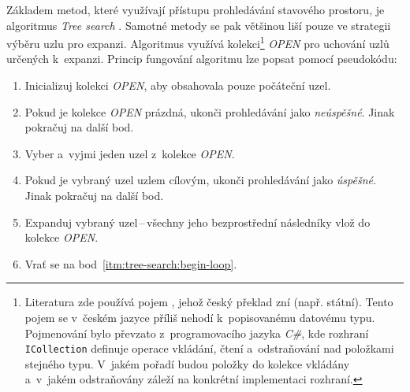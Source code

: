 Základem metod, které využívají přístupu prohledávání stavového prostoru, je algoritmus \emph{Tree search} \cite{AI_Russel_Norvig}. Samotné metody se pak většinou liší pouze ve strategii výběru uzlu pro expanzi. Algoritmus využívá kolekci\footnote{Literatura \cite{AI_Russel_Norvig} zde používá pojem , jehož český překlad zní  (např. státní). Tento pojem se v~českém jazyce příliš nehodí k~popisovanému datovému typu. Pojmenování  bylo převzato z~programovacího jazyka \emph{C\#}, kde rozhraní \texttt{ICollection} definuje operace vkládání, čtení a~odstraňování nad položkami stejného typu. V~jakém pořadí budou položky do kolekce vkládány a~v~jakém odstraňovány záleží na konkrétní implementaci rozhraní.} \emph{OPEN} pro uchování uzlů určených k~expanzi. Princip fungování algoritmu lze popsat pomocí pseudokódu:
\begin{enumerate}
    \item Inicializuj kolekci \emph{OPEN}, aby obsahovala pouze počáteční uzel.
    \item \label{itm:tree-search:begin-loop} Pokud je kolekce \emph{OPEN} prázdná, ukonči prohledávání jako \emph{neúspěšné}. Jinak pokračuj na další bod.
    \item Vyber a~vyjmi jeden uzel z~kolekce \emph{OPEN}.
    \item Pokud je vybraný uzel uzlem cílovým, ukonči prohledávání jako \emph{úspěšné}. Jinak pokračuj na další bod.
    \item Expanduj vybraný uzel\,--\,všechny jeho bezprostřední následníky vlož do kolekce \emph{OPEN}.
    \item Vrať se na bod~\ref{itm:tree-search:begin-loop}.
\end{enumerate}

